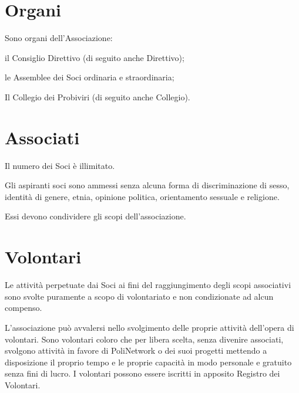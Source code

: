 \documentclass[legalpaper, 11pt]{exam}
\let\tempone\enumerate
\let\temptwo\endenumerate
\renewenvironment{enumerate}{\tempone\addtolength{\itemsep}{-0.45\baselineskip}}{\temptwo}
\begin{document}
{\section{Organi}
Sono organi dell’Associazione: 
\vspace{-5pt}
\begin{enumerate}
 \item il Consiglio Direttivo (di seguito anche Direttivo);
 \item le Assemblee dei Soci ordinaria e straordinaria;
 \item Il Collegio dei Probiviri (di seguito anche Collegio).
\end{enumerate}

\section{Associati}
\begin{enumerate}
 \item Il numero dei Soci è illimitato. 
 \item Gli aspiranti soci sono ammessi senza alcuna forma di discriminazione di sesso, identità di genere, etnia, opinione politica, orientamento sessuale e religione.
 \item Essi devono condividere gli scopi dell’associazione.
\end{enumerate}

\section{Volontari}
\begin{enumerate}
 \item Le attività perpetuate dai Soci ai fini del raggiungimento degli scopi associativi sono svolte puramente a scopo di volontariato e non condizionate ad alcun compenso.
 \item L’associazione può avvalersi nello svolgimento delle proprie attività dell’opera di volontari. Sono volontari coloro che per libera scelta, senza divenire associati, svolgono attività in favore di PoliNetwork o dei suoi progetti mettendo a disposizione il proprio tempo e le proprie capacità in modo personale e gratuito senza fini di lucro. I volontari possono essere iscritti in apposito Registro dei Volontari.
\end{enumerate}

}
\end{document}
